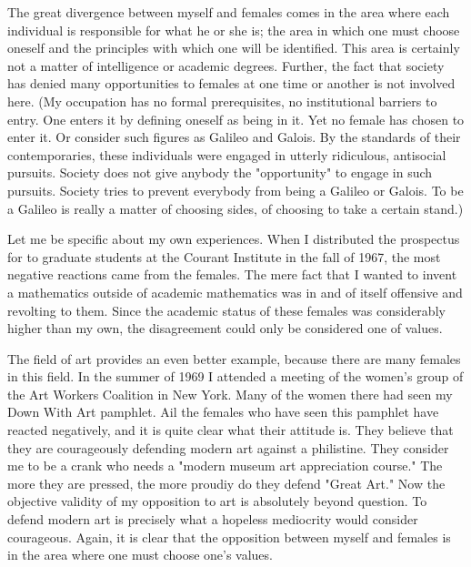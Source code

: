 \documentclass[10pt,twoside,draft]{memoir}
\begin{document}
{{{The great divergence between myself and females comes in the area 
where each individual is responsible for what he or she is; the area in which 
one must choose oneself and the principles with which one will be identified. 
This area is certainly not a matter of intelligence or academic degrees. 
Further, the fact that society has denied many opportunities to females at 
one time or another is not involved here. (My occupation has no formal 
prerequisites, no institutional barriers to entry. One enters it by defining 
oneself as being in it. Yet no female has chosen to enter it. Or consider such 
figures as Galileo and Galois. By the standards of their contemporaries, these 
individuals were engaged in utterly ridiculous, antisocial pursuits. Society 
does not give anybody the "opportunity" to engage in such pursuits. Society 
tries to prevent everybody from being a Galileo or Galois. To be a Galileo is 
really a matter of choosing sides, of choosing to take a certain stand.) 

Let me be specific about my own experiences. When I distributed the 
prospectus for  to 
graduate students at the Courant Institute in the fall of 1967, the most 
negative reactions came from the females. The mere fact that I wanted to 
invent a mathematics outside of academic mathematics was in and of itself 
offensive and revolting to them. Since the academic status of these females 
was considerably higher than my own, the disagreement could only be 
considered one of values. 

The field of art provides an even better example, because there are 
many females in this field. In the summer of 1969 I attended a meeting of 
the women's group of the Art Workers Coalition in New York. Many of the 
women there had seen my Down With Art pamphlet. Ail the females who 
have seen this pamphlet have reacted negatively, and it is quite clear what 
their attitude is. They believe that they are courageously defending modern 
art against a philistine. They consider me to be a crank who needs a "modern 
museum art appreciation course." The more they are pressed, the more 
proudiy do they defend "Great Art." Now the objective validity of my 
opposition to art is absolutely beyond question. To defend modern art is 
precisely what a hopeless mediocrity would consider courageous. Again, it is 
clear that the opposition between myself and females is in the area where 
one must choose one's values. 

}}}
\end{document}
